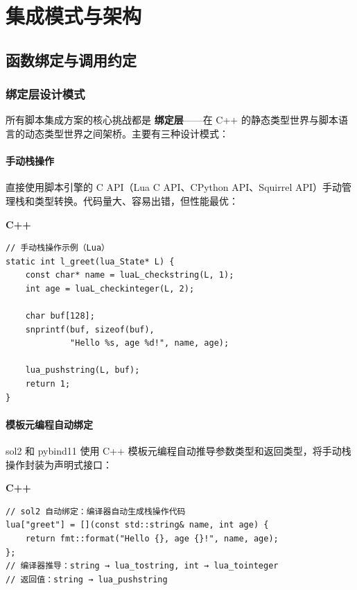 \documentclass[12pt,a4paper,fontset=fandol]{ctexbook}
\newcommand{\cpplabel}{%
  \noindent\begin{tcolorbox}[colback=algheadbg,coltext=white,
    sharp corners,boxrule=0pt,width=3.0em,height=1.4em,
    halign=center,valign=center,nobeforeafter,left=0pt,right=0pt,
    top=0pt,bottom=0pt]\small\bfseries C++\end{tcolorbox}}
\begin{document}
\part{集成模式与架构}

\chapter{函数绑定与调用约定}\label{ch:binding}

\section{绑定层设计模式}\label{sec:binding-patterns}

所有脚本集成方案的核心挑战都是 \textbf{绑定层}——在 C++ 的静态类型世界与脚本语言的动态类型世界之间架桥。主要有三种设计模式：

\subsection{手动栈操作}\label{sec:manual-stack}

直接使用脚本引擎的 C API（Lua C API、CPython API、Squirrel API）手动管理栈和类型转换。代码量大、容易出错，但性能最优：

\cpplabel
\begin{lstlisting}[style=cppstyle]
// 手动栈操作示例（Lua）
static int l_greet(lua_State* L) {
    const char* name = luaL_checkstring(L, 1);
    int age = luaL_checkinteger(L, 2);

    char buf[128];
    snprintf(buf, sizeof(buf),
             "Hello %s, age %d!", name, age);

    lua_pushstring(L, buf);
    return 1;
}
\end{lstlisting}

\subsection{模板元编程自动绑定}\label{sec:template-binding}

sol2 和 pybind11 使用 C++ 模板元编程自动推导参数类型和返回类型，将手动栈操作封装为声明式接口：

\cpplabel
\begin{lstlisting}[style=cppstyle]
// sol2 自动绑定：编译器自动生成栈操作代码
lua["greet"] = [](const std::string& name, int age) {
    return fmt::format("Hello {}, age {}!", name, age);
};
// 编译器推导：string → lua_tostring, int → lua_tointeger
// 返回值：string → lua_pushstring
\end{lstlisting}
\end{document}
